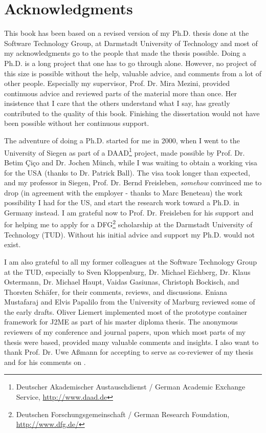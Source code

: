 \chapter*{Acknowledgments}\normalsize



This book has been based on a revised version of my Ph.D. thesis done at the Software Technology Group, at Darmstadt University of Technology and most of my acknowledgments go to the people that made the thesis possible. Doing a Ph.D. is a long project that one has to go through alone. However, no project of this size is possible without the help, valuable advice, and comments from a lot of other people. Especially my supervisor, Prof. Dr. Mira Mezini, provided continuous advice and reviewed parts of the material more than once. Her insistence that I care that the others understand what I say, has greatly contributed to the quality of this book. Finishing the dissertation would not have been possible without her continuous support.

The adventure of doing a Ph.D. started for me in 2000, when I went to the University of Siegen as part of a DAAD\footnote{Deutscher Akademischer Austauschdienst / German Academic Exchange Service, \url{http://www.daad.de}}  project, made possible by Prof. Dr.
Betim \c{C}i\c{c}o and Dr. Jochen M\"{u}nch, while I was waiting to obtain a working visa for the USA (thanks to Dr. Patrick Ball). The visa took longer than expected, and my professor in Siegen, Prof. Dr. Bernd Freisleben, \textit{somehow} convinced me to drop (in agreement with the employer - thanks to Marc Beneteau) the work possibility I had for the US, and start the research work toward a Ph.D. in Germany instead. I am grateful now to Prof. Dr. Freisleben for his support and for helping me to apply for a DFG\footnote{Deutschen Forschungsgemeinschaft / German Research Foundation, \url{http://www.dfg.de/}} scholarship at the Darmstadt University of Technology (TUD). Without his initial advice and support my Ph.D. would not exist.

I am also grateful to all my former colleagues at the Software Technology Group at the TUD, especially to Sven Kloppenburg, Dr. Michael Eichberg, Dr. Klaus Ostermann, Dr. Michael Haupt, Vaidas Gasiunas, Christoph Bockisch, and Thorsten Sch\"{a}fer, for their comments, reviews, and discussions. Eniana Mustafaraj and Elvis Papalilo from the University of Marburg reviewed some of the early drafts. Oliver Liemert implemented most of the prototype container framework for J2ME as part of his master diploma thesis. The anonymous reviewers of my conference and journal papers, upon which most parts of my thesis were based, provided many valuable comments and insights. I also want to thank Prof. Dr. Uwe A{\ss}mann for accepting to serve as co-reviewer of my thesis and for his comments on .

